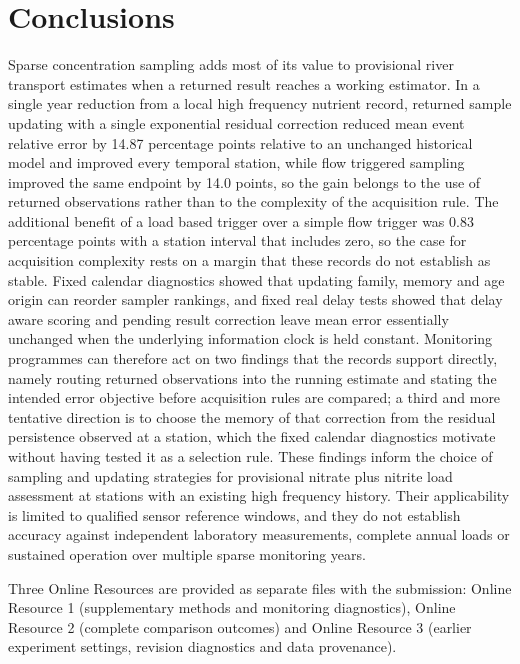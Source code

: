 \documentclass[pdflatex,sn-mathphys-num]{sn-jnl}%
\theoremstyle{thmstyleone}%
\theoremstyle{thmstyletwo}%
\theoremstyle{thmstylethree}%
\begin{document}
\section{Conclusions}\label{sec:conclusions}

Sparse concentration sampling adds most of its value to provisional river transport estimates when a returned result reaches a working estimator. In a single year reduction from a local high frequency nutrient record, returned sample updating with a single exponential residual correction reduced mean event relative error by 14.87 percentage points relative to an unchanged historical model and improved every temporal station, while flow triggered sampling improved the same endpoint by 14.0 points, so the gain belongs to the use of returned observations rather than to the complexity of the acquisition rule. The additional benefit of a load based trigger over a simple flow trigger was 0.83 percentage points with a station interval that includes zero, so the case for acquisition complexity rests on a margin that these records do not establish as stable. Fixed calendar diagnostics showed that updating family, memory and age origin can reorder sampler rankings, and fixed real delay tests showed that delay aware scoring and pending result correction leave mean error essentially unchanged when the underlying information clock is held constant. Monitoring programmes can therefore act on two findings that the records support directly, namely routing returned observations into the running estimate and stating the intended error objective before acquisition rules are compared; a third and more tentative direction is to choose the memory of that correction from the residual persistence observed at a station, which the fixed calendar diagnostics motivate without having tested it as a selection rule. These findings inform the choice of sampling and updating strategies for provisional nitrate plus nitrite load assessment at stations with an existing high frequency history. Their applicability is limited to qualified sensor reference windows, and they do not establish accuracy against independent laboratory measurements, complete annual loads or sustained operation over multiple sparse monitoring years.

\clearpage

\backmatter


Three Online Resources are provided as separate files with the submission: Online Resource 1 (supplementary methods and monitoring diagnostics), Online Resource 2 (complete comparison outcomes) and Online Resource 3 (earlier experiment settings, revision diagnostics and data provenance).
\end{document}
